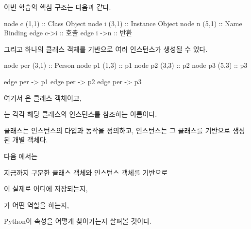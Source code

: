 이번 학습의 핵심 구조는 다음과 같다.

\begin{dhkdiagram}[in=12]
node c (1,1) :: Class Object
node i (3,1) :: Instance Object
node n (5,1) :: Name Binding
edge c->i :: 호출
edge i ->n :: 반환
\end{dhkdiagram}

그리고 하나의 클래스 객체를 기반으로 여러 인스턴스가 생성될 수 있다.

\begin{dhkdiagram}[in=10]
node per (3,1) :: Person
node p1 (1,3) :: p1
node p2 (3,3) :: p2
node p3 (5,3) :: p3

edge per -> p1
edge per -> p2
edge per -> p3
\end{dhkdiagram}

여기서 은 클래스 객체이고,

는 각각 해당 클래스의 인스턴스를 참조하는 이름이다.

클래스는 인스턴스의 타입과 동작을 정의하고, 인스턴스는 그 클래스를 기반으로 생성된 개별 객체다.

다음 에서는

지금까지 구분한 클래스 객체와 인스턴스 객체를 기반으로

이 실제로 어디에 저장되는지,

가 어떤 역할을 하는지,

Python이 속성을 어떻게 찾아가는지 살펴볼 것이다.